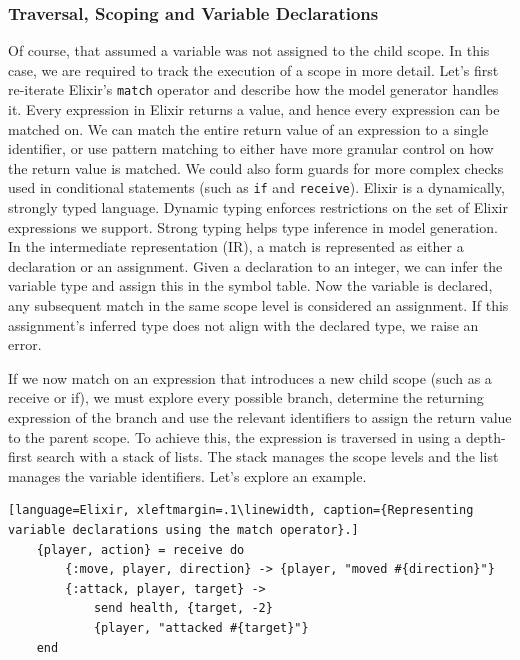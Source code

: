 \subsubsection{Traversal, Scoping and Variable Declarations}
Of course, that assumed a variable was not assigned to the child scope. In this case, we are required to track the execution of a scope in more detail. Let's first re-iterate Elixir's \texttt{match} operator and describe how the model generator handles it. Every expression in Elixir returns a value, and hence every expression can be matched on. We can match the entire return value of an expression to a single identifier, or use pattern matching to either have more granular control on how the return value is matched. We could also form guards for more complex checks used in conditional statements (such as \texttt{if} and \texttt{receive}). Elixir is a dynamically, strongly typed language. Dynamic typing enforces restrictions on the set of Elixir expressions we support. Strong typing helps type inference in model generation. In the intermediate representation (IR), a match is represented as either a declaration or an assignment. Given a declaration to an integer, we can infer the variable type and assign this in the symbol table. Now the variable is declared, any subsequent match in the same scope level is considered an assignment. If this assignment's inferred type does not align with the declared type, we raise an error.
\par
If we now match on an expression that introduces a new child scope (such as a receive or if), we must explore every possible branch, determine the returning expression of the branch and use the relevant identifiers to assign the return value to the parent scope. To achieve this, the expression is traversed in using a depth-first search with a stack of lists. The stack manages the scope levels and the list manages the variable identifiers. Let's explore an example.
\begin{lstlisting}[language=Elixir, xleftmargin=.1\linewidth, caption={Representing variable declarations using the match operator}.]
    {player, action} = receive do
        {:move, player, direction} -> {player, "moved #{direction}"}
        {:attack, player, target} -> 
            send health, {target, -2}
            {player, "attacked #{target}"}
    end
\end{lstlisting}
